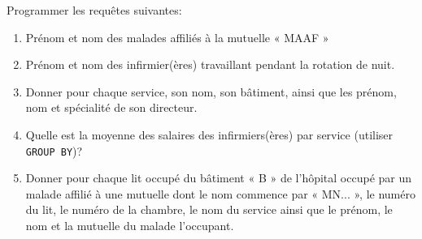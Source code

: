 \documentclass[a4paper,12pt,french]{book}
\begin{document}
\begin{exercice}
	Programmer les requêtes suivantes:
	\begin{enumerate}[\bfseries 1.]
		\item 	Prénom et nom des malades affiliés à la mutuelle « MAAF »
		\item 	Prénom et nom des infirmier(ères) travaillant pendant la rotation de nuit.
		\item 	Donner pour chaque service, son nom, son bâtiment, ainsi que les prénom, nom et
		spécialité de son directeur.
		\item 	Quelle est la moyenne des salaires des infirmiers(ères) par service (utiliser \texttt{GROUP BY})?
      	\item 	Donner pour chaque lit occupé du bâtiment « B » de l’hôpital occupé par un malade
        		affilié à une mutuelle dont le nom commence par « MN... », le numéro du lit, le
        		numéro de la chambre, le nom du service ainsi que le prénom, le nom et la mutuelle
        		du malade l’occupant.
	\end{enumerate}
\end{exercice}
\end{document}
